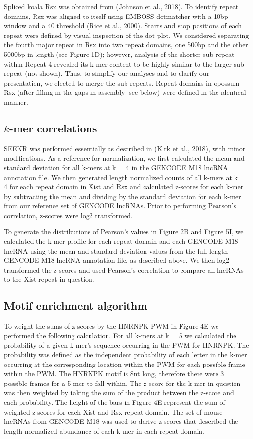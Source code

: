 Spliced koala Rsx was obtained from (Johnson et al., 2018). To identify repeat domains, Rsx was aligned to itself using EMBOSS dotmatcher with a 10bp window and a 40 threshold (Rice et al., 2000). Starts and stop positions of each repeat were defined by visual inspection of the dot plot. We considered separating the fourth major repeat in Rsx into two repeat domains, one 500bp and the other 5000bp in length (see Figure 1D); however, analysis of the shorter sub-repeat within Repeat 4 revealed its k-mer content to be highly similar to the larger sub-repeat (not shown). Thus, to simplify our analyses and to clarify our presentation, we elected to merge the sub-repeats. Repeat domains in opossum Rsx (after filling in the gaps in assembly; see below) were defined in the identical manner.

\subsection{$k$-mer correlations}
SEEKR was performed essentially as described in (Kirk et al., 2018), with minor modifications. As a reference for normalization, we first calculated the mean and standard deviation for all k-mers at k = 4 in the GENCODE M18 lncRNA annotation file. We then generated length normalized counts of all k-mers at k = 4 for each repeat domain in Xist and Rsx and calculated z-scores for each k-mer by subtracting the mean and dividing by the standard deviation for each k-mer from our reference set of GENCODE lncRNAs. Prior to performing Pearson’s correlation, z-scores were log2 transformed. 

To generate the distributions of Pearson’s values in Figure 2B and Figure 5I, we calculated the k-mer profile for each repeat domain and each GENCODE M18 lncRNA using the mean and standard deviation values from the full-length GENCODE M18 lncRNA annotation file, as described above. We then log2-transformed the z-scores and used Pearson’s correlation to compare all lncRNAs to the Xist repeat in question. 
\subsection{Motif enrichment algorithm}
To weight the sums of z-scores by the HNRNPK PWM in Figure 4E we performed the following calculation. For all k-mers at k = 5 we calculated the probability of a given k-mer’s sequence occurring in the PWM for HNRNPK. The probability was defined as the independent probability of each letter in the k-mer occurring at the corresponding location within the PWM for each possible frame within the PWM. The HNRNPK motif is 8nt long, therefore there were 3 possible frames for a 5-mer to fall within. The z-score for the k-mer in question was then weighted by taking the sum of the product between the z-score and each probability. The height of the bars in Figure 4E represent the sum of weighted z-scores for each Xist and Rsx repeat domain. The set of mouse lncRNAs from GENCODE M18 was used to derive z-scores that described the length normalized abundance of each k-mer in each repeat domain.  